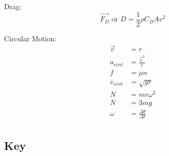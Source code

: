 \documentclass[12pt, letterpaper]{book}
\begin{document}
\begin{multicols*}{2}
        Drag: 
        \begin{equation}
            \vec{F_D}\text{ or }D = \frac{1}{2}\rho C_{D}Av^{2}
        \end{equation}

        Circular Motion:
        \begin{align}
            \vec{v}     & = r                               \\
            a_{cent}    & =\frac{\vec{v}^{2}}{r}            \\
            f           & = \mu n                           \\
            v_{cent}    & = \sqrt{gr}                       \\
            N           & = mr\omega^{2}                    \\
            N           & = 3mg                             \\
            \omega      & = \frac{\Delta \theta}{\Delta t}  \\
        \end{align}
    \end{multicols*}

    \pagebreak

    \subsection*{Key}
\end{document}
